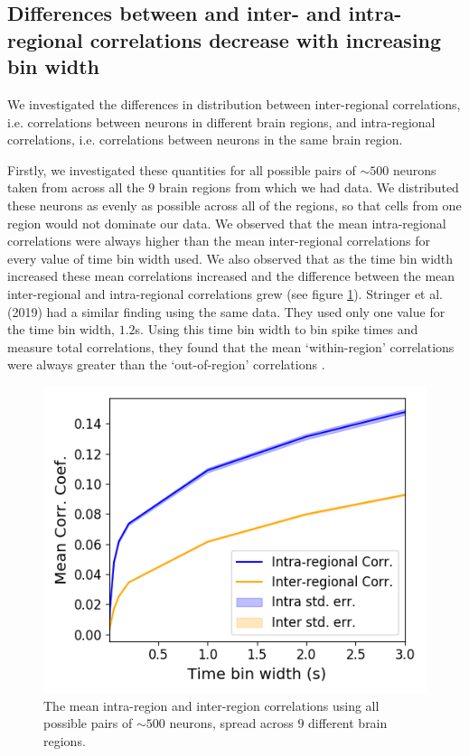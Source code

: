 %
  \subsection{Differences between and inter- and intra- regional correlations decrease with increasing bin width}
  We investigated the differences in distribution between inter-regional correlations, i.e. correlations between neurons in different brain regions, and intra-regional correlations, i.e. correlations between neurons in the same brain region.

  Firstly, we investigated these quantities for all possible pairs of $\sim 500$ neurons taken from across all the $9$ brain regions from which we had data. We distributed these neurons as evenly as possible across all of the regions, so that cells from one region would not dominate our data. We observed that the mean intra-regional correlations were always higher than the mean inter-regional correlations for every value of time bin width used. We also observed that as the time bin width increased these mean correlations increased and the difference between the mean inter-regional and intra-regional correlations grew (see figure \ref{fig:all_pairs_inter_intra_corr}). Stringer et al. (2019) had a similar finding using the same data. They used only one value for the time bin width, $1.2$s. Using this time bin width to bin spike times and measure total correlations, they found that the mean `within-region' correlations were always greater than the `out-of-region' correlations  \parencite{stringer}.

  \begin{figure}[h]
    \centering
    \includegraphics[width=0.5\linewidth]{figures/eight_probe/Krebs_inter_intra_regional_correlations.png}
    \caption{The mean intra-region and inter-region correlations using all possible pairs of $\sim 500$ neurons, spread across $9$ different brain regions.}
    \label{fig:all_pairs_inter_intra_corr}
  \end{figure}

